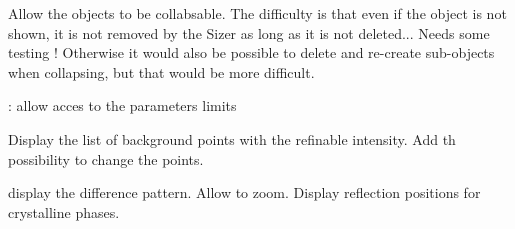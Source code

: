 
\begin{DoxyRefList}
\item[Class \mbox{\hyperlink{class_obj_cryst_1_1_w_x_cryst_obj}{Obj\+Cryst::W\+X\+Cryst\+Obj}} ]\label{todo__todo000001}%
%
Allow the objects to be collabsable. The difficulty is that even if the object is not shown, it is not removed by the Sizer as long as it is not deleted... Needs some testing ! Otherwise it would also be possible to delete and re-\/create sub-\/objects when collapsing, but that would be more difficult.  
\item[Class \mbox{\hyperlink{class_obj_cryst_1_1_w_x_field_ref_par}{Obj\+Cryst::W\+X\+Field\+Ref\+Par}} ]\label{todo__todo000004}%
%
\+: allow acces to the parameters limits  
\item[Class \mbox{\hyperlink{class_obj_cryst_1_1_w_x_powder_pattern_background}{Obj\+Cryst::W\+X\+Powder\+Pattern\+Background}} ]\label{todo__todo000003}%
%
Display the list of background points with the refinable intensity. Add th possibility to change the points.  
\item[Class \mbox{\hyperlink{class_obj_cryst_1_1_w_x_powder_pattern_graph}{Obj\+Cryst::W\+X\+Powder\+Pattern\+Graph}} ]\label{todo__todo000002}%
%
display the difference pattern. Allow to zoom. Display reflection positions for crystalline phases. 
\end{DoxyRefList}